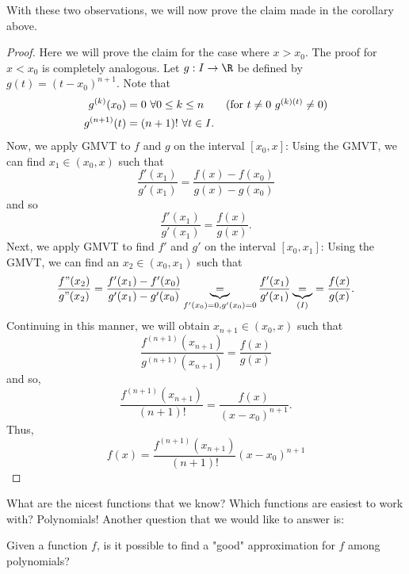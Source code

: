 With these two observations, we will now prove the claim made in the corollary above. 

\begin{proof}
Here we will prove the claim for the case where \( x > {x}_{0} \). The proof for \( x < {x}_{0} \) is completely analogous. Let \( g: I \to \R  \) be defined by \( g(t) = (t - {x}_{0})^{n+1} \). Note that 
\begin{align*}
    g^{(k)}({x}_{0}) &= 0 \ \forall 0 \leq k \leq n \tag{for \( t \neq 0  \) \( g^{(k)(t)} \neq 0  \)} \\
    g^{(n+1)}(t) &= (n + 1)! \ \forall t \in I. 
\end{align*}
Now, we apply GMVT to \( f  \) and \( g  \) on the interval \( [{x}_{0},x] \): Using the GMVT, we can find \( {x}_{1} \in ({x}_{0},x) \) such that 
\[  \frac{ f'({x}_{1}) }{ g'({x}_{1}) }  = \frac{ f(x) - f({x}_{0}) }{  g(x) - g({x}_{0}) } \]
and so 
\[  \frac{ f'({x}_{1}) }{ g'({x}_{1}) } = \frac{ f(x) }{ g(x) }. \tag{I} \]
Next, we apply GMVT to find \( f'  \) and \( g'  \) on the interval \( [{x}_{0}, {x}_{1}] \): Using the GMVT, we can find an \( {x}_{2} \in ({x}_{0}, {x}_{1}) \) such that 
\[  \frac{ f"({x}_{2}) }{ g"({x}_{2}) }  = \frac{ f'({x}_{1}) - f'({x}_{0}) }{  g'({x}_{1}) - g'({x}_{0}) } \underbrace{=}_{f'({x}_{0})=0, g'({x}_{0}) = 0} \frac{ f'({x}_{1}) }{  g'({x}_{1}) }  \underbrace{=}_{(I)} = \frac{ f(x) }{ g(x) }.  \]
Continuing in this manner, we will obtain \( {x}_{n+1} \in ({x}_{0}, x)  \) such that 
\[  \frac{ f^{(n+1)}({x}_{n+1}) }{ g^{(n+1)}({x}_{n+1}) }  = \frac{ f(x) }{  g(x) } \]
and so,
\[  \frac{ f^{(n+1)}({x}_{n+1})  }{ (n+1)! }  = \frac{ f(x) }{  (x - {x}_{0})^{n+1} }.  \]
Thus, 
\[  f(x) = \frac{ f^{(n+1)}({x}_{n+1}) }{ (n+1)! } (x - {x}_{0})^{n+1} \]
\end{proof}

What are the nicest functions that we know? Which functions are easiest to work with? Polynomials! Another question that we would like to answer is:
\begin{center}
    Given a function \( f \), is it possible to find a "good" approximation for \( f  \) among polynomials?
\end{center}

